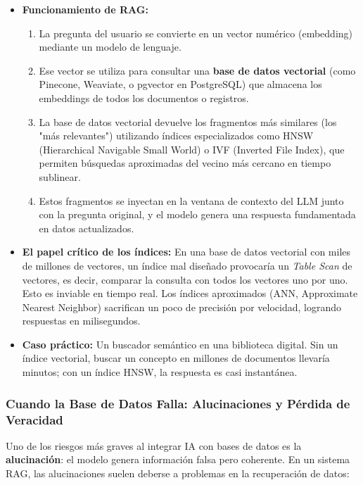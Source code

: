 \documentclass[12pt,a4paper,openany,oneside]{book}
\begin{document}
\begin{itemize}
    \item \textbf{Funcionamiento de RAG:}
    \begin{enumerate}
        \item La pregunta del usuario se convierte en un vector numérico (embedding) mediante un modelo de lenguaje.
        \item Ese vector se utiliza para consultar una \textbf{base de datos vectorial} (como Pinecone, Weaviate, o pgvector en PostgreSQL) que almacena los embeddings de todos los documentos o registros.
        \item La base de datos vectorial devuelve los fragmentos más similares (los "más relevantes") utilizando índices especializados como HNSW (Hierarchical Navigable Small World) o IVF (Inverted File Index), que permiten búsquedas aproximadas del vecino más cercano en tiempo sublinear.
        \item Estos fragmentos se inyectan en la ventana de contexto del LLM junto con la pregunta original, y el modelo genera una respuesta fundamentada en datos actualizados.
    \end{enumerate}
    \item \textbf{El papel crítico de los índices:} En una base de datos vectorial con miles de millones de vectores, un índice mal diseñado provocaría un \textit{Table Scan} de vectores, es decir, comparar la consulta con todos los vectores uno por uno. Esto es inviable en tiempo real. Los índices aproximados (ANN, Approximate Nearest Neighbor) sacrifican un poco de precisión por velocidad, logrando respuestas en milisegundos.
    \item \textbf{Caso práctico:} Un buscador semántico en una biblioteca digital. Sin un índice vectorial, buscar un concepto en millones de documentos llevaría minutos; con un índice HNSW, la respuesta es casi instantánea.
\end{itemize}

\subsubsection{Cuando la Base de Datos Falla: Alucinaciones y Pérdida de Veracidad}
Uno de los riesgos más graves al integrar IA con bases de datos es la \textbf{alucinación}: el modelo genera información falsa pero coherente. En un sistema RAG, las alucinaciones suelen deberse a problemas en la recuperación de datos:
\end{document}
